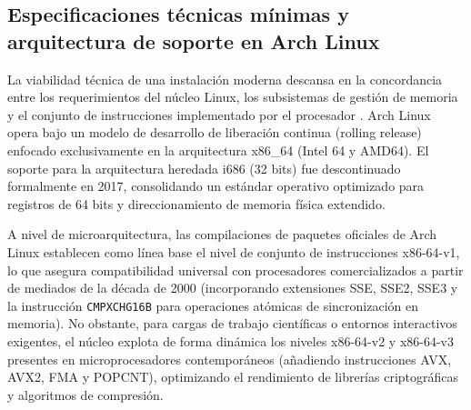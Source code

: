 \documentclass[12pt]{article}
\begin{document}
\subsection{Especificaciones técnicas mínimas y arquitectura de soporte en Arch Linux}
\label{sec:especificacionesTecnicas}

La viabilidad técnica de una instalación moderna descansa en la concordancia entre los requerimientos del núcleo Linux, los subsistemas de gestión de memoria y el conjunto de instrucciones implementado por el procesador \parencite[\S 1.2, pp.\ 4--6]{mchoes2011sistemas}. Arch Linux opera bajo un modelo de desarrollo de liberación continua (rolling release) enfocado exclusivamente en la arquitectura x86\_64 (Intel 64 y AMD64). El soporte para la arquitectura heredada i686 (32 bits) fue descontinuado formalmente en 2017, consolidando un estándar operativo optimizado para registros de 64 bits y direccionamiento de memoria física extendido.

A nivel de microarquitectura, las compilaciones de paquetes oficiales de Arch Linux establecen como línea base el nivel de conjunto de instrucciones x86-64-v1, lo que asegura compatibilidad universal con procesadores comercializados a partir de mediados de la década de 2000 (incorporando extensiones SSE, SSE2, SSE3 y la instrucción \texttt{CMPXCHG16B} para operaciones atómicas de sincronización en memoria). No obstante, para cargas de trabajo científicas o entornos interactivos exigentes, el núcleo explota de forma dinámica los niveles x86-64-v2 y x86-64-v3 presentes en microprocesadores contemporáneos (añadiendo instrucciones AVX, AVX2, FMA y POPCNT), optimizando el rendimiento de librerías criptográficas y algoritmos de compresión.
\end{document}
